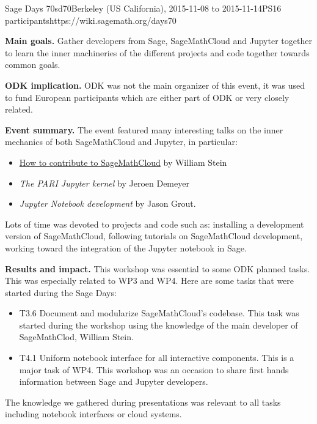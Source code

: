 \begin{event}{Sage Days 70}{sd70}{Berkeley (US California), 2015-11-08 to 2015-11-14}{PS}{16 participants}{https://wiki.sagemath.org/days70}

\textbf{Main goals.} Gather developers from Sage, SageMathCloud and Jupyter together to learn the
inner machineries of the different projects and code together towards common goals.

\textbf{ODK implication.} ODK was not the main organizer of this event, it was used to fund
European participants which are either part of ODK or very closely related.

\textbf{Event summary.} The event featured many interesting talks on the inner mechanics of
both SageMathCloud and Jupyter, in particular:
\begin{itemize}
\item \href{https://youtu.be/GOuy07Kift4}{How to contribute to SageMathCloud} by William Stein
\item \emph{The PARI Jupyter kernel} by Jeroen Demeyer
\item \emph{Jupyter Notebook development} by Jason Grout.
\end{itemize}
Lots of time was devoted to projects and code such as: installing a development version of SageMathCloud,
following tutorials on SageMathCloud development, working toward the integration of the Jupyter notebook
in Sage.


\textbf{Results and impact.} 
This workshop was essential to some ODK planned tasks. This was especially related to WP3 and WP4. Here are some tasks that
were started during the Sage Days:
\begin{itemize}
\item T3.6 Document and modularize SageMathCloud's codebase. This task was started during the workshop using the 
knowledge of the main developer of SageMathClod, William Stein.

\item T4.1 Uniform notebook interface for all interactive components. This is a major task of WP4. This workshop
was an occasion to share first hands information between Sage and Jupyter developers.
\end{itemize}
The knowledge we gathered during presentations was relevant to all tasks including notebook interfaces or cloud
systems.

\end{event}